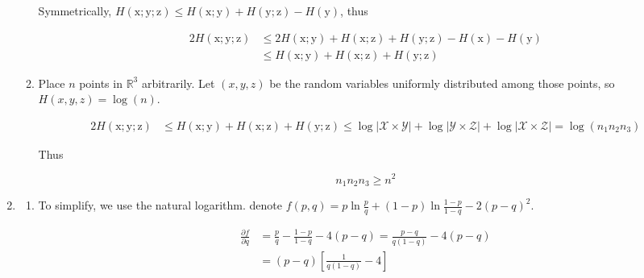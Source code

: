 \documentclass[a4paper]{article}
\begin{document}
\begin{enumerate}
\begin{enumerate}
  Symmetrically, $H(\mathrm{x};\mathrm{y};\mathrm{z}) \leqslant H(\mathrm{x};\mathrm{y}) + H(\mathrm{y};\mathrm{z}) - H(\mathrm{y})$, thus

  \begin{equation}
    \begin{aligned}
      2 H(\mathrm{x};\mathrm{y};\mathrm{z}) & \leqslant 2H(\mathrm{x};\mathrm{y}) + H(\mathrm{x};\mathrm{z})+ H(\mathrm{y};\mathrm{z})- H(\mathrm{x})- H(\mathrm{y}) \\ & \leqslant H(\mathrm{x};\mathrm{y}) + H(\mathrm{x};\mathrm{z})+ H(\mathrm{y};\mathrm{z})
    \end{aligned}
  \end{equation}

  \item Place $n$ points in $\mathbb{R}^3$ arbitrarily. Let $(x,y,z)$ be the random variables uniformly distributed among those points, so $H(x,y,z) = \log (n)$. 
  
  \begin{equation}
    \begin{aligned}
      2 H(\mathrm{x};\mathrm{y};\mathrm{z}) &  \leqslant H(\mathrm{x};\mathrm{y}) + H(\mathrm{x};\mathrm{z})+ H(\mathrm{y};\mathrm{z}) \leqslant \log |\mathcal{X}\times \mathcal{Y}| + \log |\mathcal{Y}\times \mathcal{Z}| + \log |\mathcal{X}\times \mathcal{Z}|  = \log(n_1n_2n_3)
    \end{aligned}
  \end{equation}

  Thus 

  \begin{equation}
    n_1n_2n_3 \geqslant n^2
  \end{equation}
\end{enumerate}
  
\item \begin{enumerate} %
  \item To simplify, we use the natural logarithm. denote $f(p,q) = p \ln \frac{p}{q} + (1-p)\ln \frac{1-p}{1-q} - 2(p-q)^2$.
  
  \begin{equation}
    \begin{aligned}
      \frac{\partial f}{\partial q} & = \frac {p}{q} - \frac {1-p}{1-q}-4(p-q) = \frac{p-q}{q(1-q)} -4 (p-q) \\
      & = (p-q)[\frac 1 {q(1-q)} - 4]
    \end{aligned}
  \end{equation}


\end{enumerate}
\end{enumerate}
\end{document}
